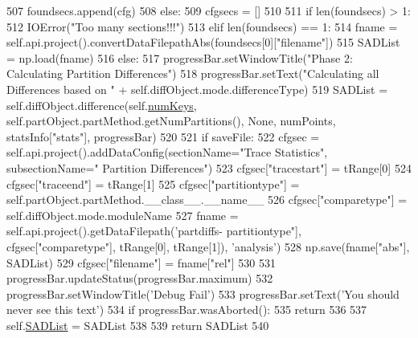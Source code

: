 \begin{DoxyCode}
507                     foundsecs.append(cfg)
508         \textcolor{keywordflow}{else}:
509             cfgsecs = []
510 
511         \textcolor{keywordflow}{if} len(foundsecs) > 1:
512             IOError(\textcolor{stringliteral}{"Too many sections!!!"})
513         \textcolor{keywordflow}{elif} len(foundsecs) == 1:
514             fname = self.api.project().convertDataFilepathAbs(foundsecs[0][\textcolor{stringliteral}{"filename"}])
515             SADList = np.load(fname)
516         \textcolor{keywordflow}{else}:
517             progressBar.setWindowTitle(\textcolor{stringliteral}{"Phase 2: Calculating Partition Differences"})
518             progressBar.setText(\textcolor{stringliteral}{"Calculating all Differences based on "} + 
      self.diffObject.mode.differenceType)
519             SADList = self.diffObject.difference(self.\hyperlink{classsoftware_1_1chipwhisperer_1_1analyzer_1_1utils_1_1TraceExplorerScripts_1_1PartitionDisplay_1_1PartitionDisplay_a9609f827035095f248787dbde121fa08}{numKeys}, 
      self.partObject.partMethod.getNumPartitions(), \textcolor{keywordtype}{None}, numPoints, statsInfo[\textcolor{stringliteral}{"stats"}], progressBar)
520 
521             \textcolor{keywordflow}{if} saveFile:
522                 cfgsec = self.api.project().addDataConfig(sectionName=\textcolor{stringliteral}{"Trace Statistics"}, subsectionName=\textcolor{stringliteral}{"
      Partition Differences"})
523                 cfgsec[\textcolor{stringliteral}{"tracestart"}] = tRange[0]
524                 cfgsec[\textcolor{stringliteral}{"traceend"}] = tRange[1]
525                 cfgsec[\textcolor{stringliteral}{"partitiontype"}] = self.partObject.partMethod.\_\_class\_\_.\_\_name\_\_
526                 cfgsec[\textcolor{stringliteral}{"comparetype"}] = self.diffObject.mode.moduleName
527                 fname = self.api.project().getDataFilepath(\textcolor{stringliteral}{'partdiffs-%
      partitiontype"}], cfgsec[\textcolor{stringliteral}{"comparetype"}], tRange[0], tRange[1]), \textcolor{stringliteral}{'analysis'})
528                 np.save(fname[\textcolor{stringliteral}{"abs"}], SADList)
529                 cfgsec[\textcolor{stringliteral}{"filename"}] = fname[\textcolor{stringliteral}{"rel"}]
530 
531         progressBar.updateStatus(progressBar.maximum)
532         progressBar.setWindowTitle(\textcolor{stringliteral}{'Debug Fail'})
533         progressBar.setText(\textcolor{stringliteral}{'You should never see this text'})
534         \textcolor{keywordflow}{if} progressBar.wasAborted():
535             \textcolor{keywordflow}{return}
536 
537         self.\hyperlink{classsoftware_1_1chipwhisperer_1_1analyzer_1_1utils_1_1TraceExplorerScripts_1_1PartitionDisplay_1_1PartitionDisplay_a72d55c478d4e6a5337ac102db3a17afa}{SADList} = SADList
538 
539         \textcolor{keywordflow}{return} SADList
540 
\end{DoxyCode}
